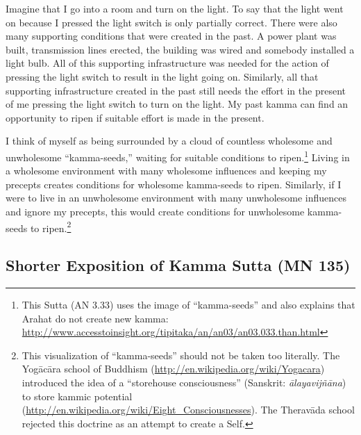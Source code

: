 Imagine that I go into a room and turn on the light. To say that the light went on because I pressed the light switch is only partially correct. There were also many supporting conditions that were created in the past. A power plant was built, transmission lines erected, the building was wired and somebody installed a light bulb. All of this supporting infrastructure was needed for the action of pressing the light switch to result in the light going on. Similarly, all that supporting infrastructure created in the past still needs the effort in the present of me pressing the light switch to turn on the light. My past kamma can find an opportunity to ripen if suitable effort is made in the present.

I think of myself as being surrounded by a cloud of countless wholesome and unwholesome “kamma-seeds,” waiting for suitable conditions to ripen.\footnote{This Sutta (AN 3.33) uses the image of “kamma-seeds” and also explains that Arahat do not create new kamma: \url{http://www.accesstoinsight.org/tipitaka/an/an03/an03.033.than.html}} Living in a wholesome environment with many wholesome influences and keeping my precepts creates conditions for wholesome kamma-seeds to ripen. Similarly, if I were to live in an unwholesome environment with many unwholesome influences and ignore my precepts, this would create conditions for unwholesome kamma-seeds to ripen.\footnote{This visualization of “kamma-seeds” should not be taken too literally. The Yogācāra school of Buddhism (\url{http://en.wikipedia.org/wiki/Yogacara}) introduced the idea of a “storehouse consciousness” (Sanskrit: \textit{ālayavijñāna}) to store kammic potential (\url{http://en.wikipedia.org/wiki/Eight_Consciousnesses}). The Theravāda school rejected this doctrine as an attempt to create a Self.}

\subsection*{Shorter Exposition of Kamma Sutta (MN 135)}

